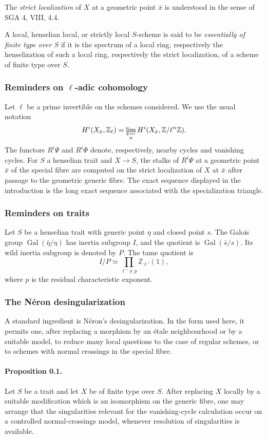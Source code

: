 \documentclass[12pt]{article}
\newcommand{\ZZ}{\mathbb Z}
\newcommand{\Gal}{\operatorname{Gal}}
\begin{document}
The \emph{strict localization} of $X$ at a geometric point $\bar x$ is understood in the sense of SGA 4, VIII, 4.4.

A local, henselian local, or strictly local $S$-scheme is said to be \emph{essentially of finite type over $S$} if it is the spectrum of a local ring, respectively the henselization of such a local ring, respectively the strict localization, of a scheme of finite type over $S$.

\subsubsection*{Reminders on $\ell$-adic cohomology}

Let $\ell$ be a prime invertible on the schemes considered. We use the usual notation
\[
H^i(X_{\bar x},\ZZ_\ell)=\varprojlim_n H^i(X_{\bar x},\ZZ/\ell^n\ZZ).
\]
The functors $R^i\Psi$ and $R^i\Phi$ denote, respectively, nearby cycles and vanishing cycles. For $S$ a henselian trait and $X\to S$, the stalks of $R^i\Psi$ at a geometric point $\bar x$ of the special fibre are computed on the strict localization of $X$ at $\bar x$ after passage to the geometric generic fibre. The exact sequence displayed in the introduction is the long exact sequence associated with the specialization triangle.

\subsubsection*{Reminders on traits}

Let $S$ be a henselian trait with generic point $\eta$ and closed point $s$. The Galois group $\Gal(\bar\eta/\eta)$ has inertia subgroup $I$, and the quotient is $\Gal(\bar s/s)$. Its wild inertia subgroup is denoted by $P$. The tame quotient is
\[
I/P\simeq \prod_{\ell'\neq p}\ZZ_{\ell'}(1),
\]
where $p$ is the residual characteristic exponent.

\subsubsection*{The Néron desingularization}

A standard ingredient is Néron's desingularization. In the form used here, it permits one, after replacing a morphism by an étale neighbourhood or by a suitable model, to reduce many local questions to the case of regular schemes, or to schemes with normal crossings in the special fibre.

\paragraph{Proposition 0.1.}
Let $S$ be a trait and let $X$ be of finite type over $S$. After replacing $X$ locally by a suitable modification which is an isomorphism on the generic fibre, one may arrange that the singularities relevant for the vanishing-cycle calculation occur on a controlled normal-crossings model, whenever resolution of singularities is available.
\end{document}
